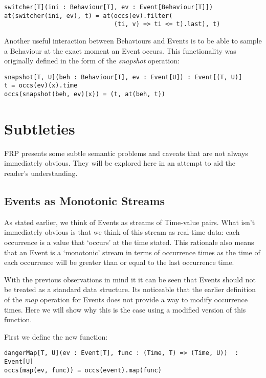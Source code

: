 \begin{verbatim}
switcher[T](ini : Behaviour[T], ev : Event[Behaviour[T]])
at(switcher(ini, ev), t) = at(occs(ev).filter(
                              (ti, v) => ti <= t).last), t)
\end{verbatim}

        Another useful interaction between Behaviours and Events is to be able to sample
        a Behaviour at the exact moment an Event occurs. This functionality was originally defined in the
        form of the \emph{snapshot} operation:

\begin{verbatim}
snapshot[T, U](beh : Behaviour[T], ev : Event[U]) : Event[(T, U)]
t = occs(ev)(x).time
occs(snapshot(beh, ev)(x)) = (t, at(beh, t))
\end{verbatim} 
  
  \section{Subtleties}
    FRP presents some subtle semantic problems and caveats that are not always immediately obvious.
    They will be explored here in an attempt to aid the reader's understanding.
     
    \subsection{Events as Monotonic Streams}
      As stated earlier, we think of Events as streams of Time-value pairs. What isn't immediately
      obvious is that we think of this stream as real-time data: each occurrence is a value that
      `occurs' at the time stated. This rationale also means that an Event is a `monotonic' stream in terms of
      occurrence times as the time of each occurrence will be greater than or equal to the last occurrence
      time.
      
      With the previous observations in mind it it can be seen that Events should not be treated as a
      standard data structure. Its noticeable that the earlier definition of the \emph{map} operation for
      Events does not provide a way to modify occurrence times. Here we will show why this is
      the case using a modified version of this function.
      
      First we define the new function:
      
\begin{verbatim}
dangerMap[T, U](ev : Event[T], func : (Time, T) => (Time, U))  : Event[U]
occs(map(ev, func)) = occs(event).map(func)
\end{verbatim}


